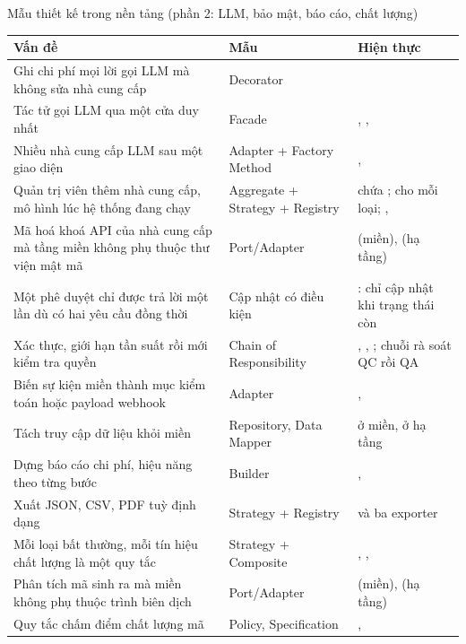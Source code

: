 \begin{table}{Mẫu thiết kế trong nền tảng (phần 2: LLM, bảo mật, báo cáo, chất lượng)}
\label{tab:mau-2}
\footnotesize
\begin{tabularx}{\textwidth}{|L|P{2.7cm}|P{5.3cm}|}
\hline
\textbf{Vấn đề} & \textbf{Mẫu} & \textbf{Hiện thực} \\ \hline
Ghi chi phí mọi lời gọi LLM mà không sửa nhà cung cấp & Decorator &  \\ \hline
Tác tử gọi LLM qua một cửa duy nhất & Facade & , ,  \\ \hline
Nhiều nhà cung cấp LLM sau một giao diện & Adapter + Factory Method & ,  \\ \hline
Quản trị viên thêm nhà cung cấp, mô hình lúc hệ thống đang chạy & Aggregate + Strategy + Registry &  chứa ;  cho mỗi loại; ,  \\ \hline
Mã hoá khoá API của nhà cung cấp mà tầng miền không phụ thuộc thư viện mật mã & Port/Adapter &  (miền),  (hạ tầng) \\ \hline
Một phê duyệt chỉ được trả lời một lần dù có hai yêu cầu đồng thời & Cập nhật có điều kiện & : chỉ cập nhật khi trạng thái còn  \\ \hline
Xác thực, giới hạn tần suất rồi mới kiểm tra quyền & Chain of Responsibility & , , ; chuỗi rà soát QC rồi QA \\ \hline
Biến sự kiện miền thành mục kiểm toán hoặc payload webhook & Adapter & ,  \\ \hline
Tách truy cập dữ liệu khỏi miền & Repository, Data Mapper &  ở miền,  ở hạ tầng \\ \hline
Dựng báo cáo chi phí, hiệu năng theo từng bước & Builder & ,  \\ \hline
Xuất JSON, CSV, PDF tuỳ định dạng & Strategy + Registry &  và ba exporter \\ \hline
Mỗi loại bất thường, mỗi tín hiệu chất lượng là một quy tắc & Strategy + Composite & , ,  \\ \hline
Phân tích mã sinh ra mà miền không phụ thuộc trình biên dịch & Port/Adapter &  (miền),  (hạ tầng) \\ \hline
Quy tắc chấm điểm chất lượng mã & Policy, Specification & ,  \\ \hline
\end{tabularx}
\end{table}

